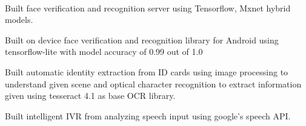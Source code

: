  \\

\vspace{\topsep} %
\begin{tightitemize} 
\item Built face verification and recognition server using Tensorflow, Mxnet hybrid models.
\item Built on device face verification and recognition library for Android using tensorflow-lite with model accuracy of 0.99 out of 1.0
\item Built automatic identity extraction from ID cards using image processing to understand given scene and optical character recognition to extract information given using tesseract 4.1 as base OCR library.
\item Built intelligent IVR from analyzing speech input using google's speech API.
\end{tightitemize}

\sectionspace %